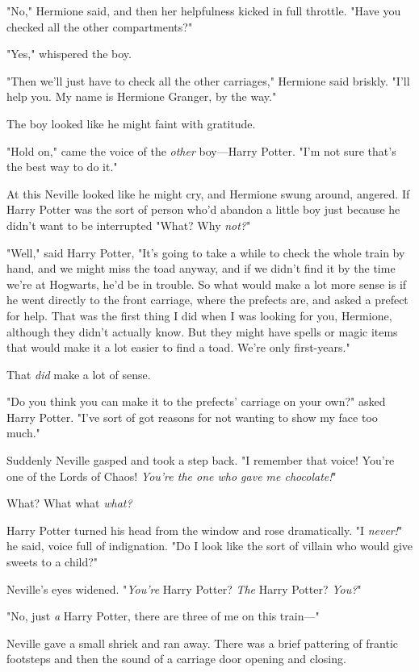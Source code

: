 "No," Hermione said, and then her helpfulness kicked in full throttle. "Have
you checked all the other compartments?"

"Yes," whispered the boy.

"Then we'll just have to check all the other carriages," Hermione said briskly.
"I'll help you. My name is Hermione Granger, by the way."

The boy looked like he might faint with gratitude.

"Hold on," came the voice of the \emph{other} boy—Harry Potter. "I'm not sure
that's the best way to do it."

At this Neville looked like he might cry, and Hermione swung around, angered.
If Harry Potter was the sort of person who'd abandon a little boy just because
he didn't want to be interrupted{\el} "What? Why \emph{not?}"

"Well," said Harry Potter, "It's going to take a while to check the whole train
by hand, and we might miss the toad anyway, and if we didn't find it by the
time we're at Hogwarts, he'd be in trouble. So what would make a lot more sense
is if he went directly to the front carriage, where the prefects are, and asked
a prefect for help. That was the first thing I did when I was looking for you,
Hermione, although they didn't actually know. But they might have spells or
magic items that would make it a lot easier to find a toad. We're only
first-years."

That{\el} \emph{did} make a lot of sense.

"Do you think you can make it to the prefects' carriage on your own?" asked
Harry Potter. "I've sort of got reasons for not wanting to show my face too
much."

Suddenly Neville gasped and took a step back. "I remember that voice! You're
one of the Lords of Chaos! \emph{You're the one who gave me chocolate!}"

What? What what \emph{what?}

Harry Potter turned his head from the window and rose dramatically. "I
\emph{never!}" he said, voice full of indignation. "Do I look like the sort of
villain who would give sweets to a child?"

Neville's eyes widened. "\emph{You're} Harry Potter? \emph{The} Harry Potter?
\emph{You?}"

"No, just \emph{a} Harry Potter, there are three of me on this train—"

Neville gave a small shriek and ran away. There was a brief pattering of
frantic footsteps and then the sound of a carriage door opening and closing.

